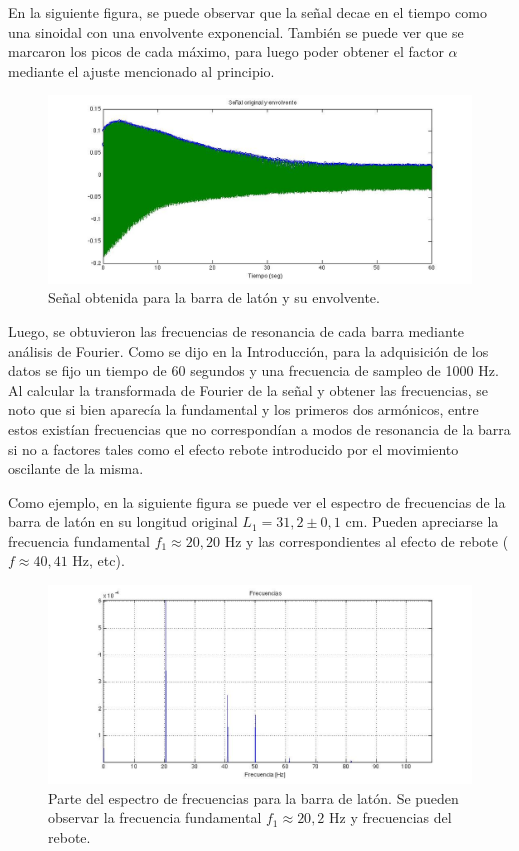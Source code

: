 \documentclass[twoside,twocolumn,a4paper]{article}
\begin{document}
En la siguiente figura, se puede observar que la se\~nal decae en el tiempo como una sinoidal con una envolvente exponencial. Tambi\'en se puede ver que se marcaron los picos de cada m\'aximo, para luego poder obtener el factor $\alpha$ mediante el ajuste mencionado al principio.

\begin{figure}[H]
\includegraphics[width=\linewidth]{senalenvolvente.jpg}
\caption{Se\~nal obtenida para la barra de lat\'on y su envolvente.}
\label{fig:senalenvolvente}
\end{figure}

Luego, se obtuvieron las frecuencias de resonancia de cada barra mediante an\'alisis de Fourier. Como se dijo en la Introducci\'on, para la adquisici\'on de los datos se fijo un tiempo de 60 segundos y una frecuencia de sampleo de 1000 Hz. Al calcular la transformada de Fourier de la se\~nal y obtener las frecuencias, se noto que si bien aparec\'ia la fundamental y los primeros dos arm\'onicos, entre estos exist\'ian frecuencias que no correspond\'ian a modos de resonancia de la barra si no a factores tales como el efecto rebote introducido por el movimiento oscilante de la misma.

Como ejemplo, en la siguiente figura se puede ver el espectro de frecuencias de la barra de lat\'on en su longitud original $L_{1} = 31,2 \pm 0,1$ cm. Pueden apreciarse la frecuencia fundamental $f_{1} \approx 20,20$ Hz y las correspondientes al efecto de rebote ($f \approx 40,41$ Hz, etc). \newline

\begin{figure}[H]
\includegraphics[width=\linewidth]{espectrolaton.jpg}
\caption{Parte del espectro de frecuencias para la barra de lat\'on. Se pueden observar la frecuencia fundamental $f_{1} \approx 20,2$ Hz y frecuencias del rebote.}
\label{fig:espectrolaton}
\end{figure}
\end{document}
